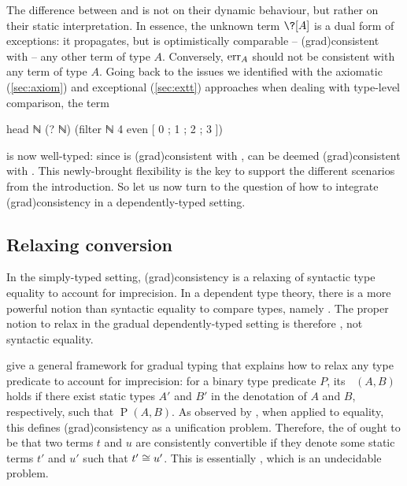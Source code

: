The difference between  and  is not on their dynamic behaviour,
but rather on their static interpretation.
%
In essence, the unknown term $\?[A]$ is a dual form of exceptions: it
propagates, but is optimistically comparable – \ie \kl(grad){consistent}
with – any other term of type $A$. Conversely, $\err[A]$ should not be consistent
with any term of type $A$.
%
Going back to the issues we identified with the axiomatic (\cref{sec:axiom})
and exceptional (\cref{sec:extt}) approaches when dealing with type-level comparison,
the term
\begin{coqcode}
  head ℕ (? ℕ) (filter ℕ 4 even [ 0 ; 1 ; 2 ; 3 ])
\end{coqcode}
is now well-typed: since  is \kl(grad){consistent} with ,
 can be deemed \kl(grad){consistent} with
.
This newly-brought flexibility is the key to support the different scenarios from the introduction.
%
So let us now turn to the question of how to integrate \kl(grad){consistency} in
a dependently-typed setting.

\subsection{Relaxing conversion}

In the simply-typed setting, \kl(grad){consistency} is a relaxing of syntactic type equality
to account for imprecision.
In a dependent type theory, there is a more powerful notion than syntactic equality to compare types, namely .
The proper notion to relax in the gradual dependently-typed setting is therefore ,
not syntactic equality.

\AP {} give a general framework for gradual typing that explains how to relax any type predicate to account for imprecision:
for a binary type predicate $P$, its  $\mathop{\tilde{P}}(A,B)$ holds
if there exist static types $A'$ and $B'$ in the denotation%
of $A$ and $B$, respectively, such that $\mathop{P}(A,B)$.
As observed by , when applied to equality,
this defines \kl(grad){consistency} as a unification problem.
Therefore, the  of  ought to be that two terms
$t$ and $u$ are consistently convertible if they denote some static terms $t'$ and $u'$ such that $t' \cong u'$. This is essentially ,
which is an undecidable problem.

